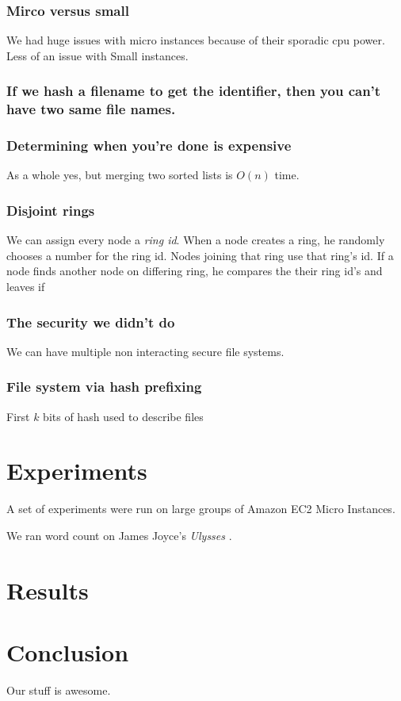 \documentclass[conference, compsocconf, letterpaper]{IEEEtran}
\begin{document}
\subsubsection{Mirco versus small}
We had huge issues with micro instances because of their sporadic cpu power.  Less of an issue with Small instances.


\subsubsection{If we hash a filename to get the identifier, then you can't have two same file names.}

\subsubsection{Determining when you're done is expensive}
As a whole yes, but merging two sorted lists is $O(n)$ time. 


\subsubsection{Disjoint rings}
We can assign every node a \emph{ring id}.  When a node creates a ring, he randomly chooses a number for the ring id.  Nodes joining that ring use that ring's id.  If a node finds another node on differing ring, he compares the their ring id's and leaves if  

\subsubsection{The security we didn't do}
We can have multiple non interacting secure file systems.


\subsubsection{File system via hash prefixing}
First $k$ bits of hash used to describe files

\section{Experiments}
A set of experiments were run on large groups of Amazon EC2 Micro Instances\cite{amazon-micro}.

We ran word count on James Joyce's \emph{Ulysses} \cite{joyce1924ulysses}.


 
\section{Results}

\section{Conclusion}
Our stuff \cite{code} is awesome.



\end{document}
